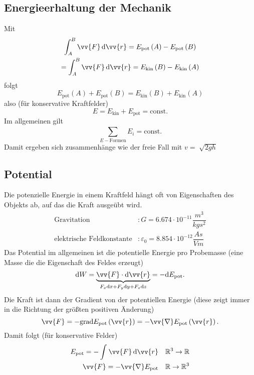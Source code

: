 \documentclass[a4paper,12pt]{article}
\newcommand{\td}{\,\text{d}}
\begin{document}
\subsection{Energieerhaltung der Mechanik}
Mit
\begin{gather*}
        \int_{A}^{B}\vv{F}\td\vv{r}=E_{\text{pot}}\left(A\right)-E_{\text{pot}}\left(B\right)\\
        =\int_{A}^{B}\vv{F}\td\vv{r}=E_{\text{kin}}\left(B\right)-E_{\text{kin}}\left(A\right)
\end{gather*}
folgt
\[ 
        E_{\text{pot}}\left(A\right)+E_{\text{pot}}\left(B\right)=E_{\text{kin}}\left(B\right)+E_{\text{kin}}\left(A\right)
\] 
also (für konservative Kraftfelder)
\[ 
        E=E_{\text{kin}}+E_{\text{pot}}=\text{const}
.\] 
Im allgemeinen gilt
\[ 
        \sum_{E-\text{Formen}}^{}E_i=\text{const}
.\] 
Damit ergeben sich zusammenhänge wie der freie Fall mit $v=\sqrt[]{2gh}$  

\subsection{Potential}
Die potenzielle Energie in einem Kraftfeld hängt oft von Eigenschaften des Objekts ab, auf das die Kraft ausgeübt wird.
\begin{align*}
        \text{Gravitation}&:G=6.674\cdot 10^{-11}\dfrac{m ^{3}}{kgs ^2}\\
        \text{elektrische Feldkonstante}&:\varepsilon _0=8.854\cdot 10^{-12}\dfrac{As}{Vm}
\end{align*}
Das Potential im allgemeinen ist die potentielle Energie pro Probemasse (eine Masse die die Eigenschaft des Feldes erzeugt)
\[ 
        \text{d}W=\underbrace{\vv{F}\cdot \text{d}\vv{r}}_{F_x\text{d}x+F_y\text{d}y+F_z\text{d}z}=-\text{d}E_{\text{pot}}
.\] 
Die Kraft ist dann der Gradient von der potentiellen Energie (diese zeigt immer in die Richtung der größten positiven Änderung)
\[ 
        \vv{F}=-\text{grad}E_{\text{pot}}\left(\vv{r}\right)=-\vv{\nabla}E_{\text{pot}}\left(\vv{r}\right)
.\] 
Damit folgt (für konservative Felder)
\begin{align*}
        E_{\text{pot}}=-\int_{}^{}\vv{F}\td\vv{r}&&\mathbb{R}^{3}\rightarrow \mathbb{R}\\
        \vv{F}=-\vv{\nabla}E_{\text{pot}}&&\mathbb{R}\rightarrow \mathbb{R}^{3}\\
\end{align*}
\end{document}
